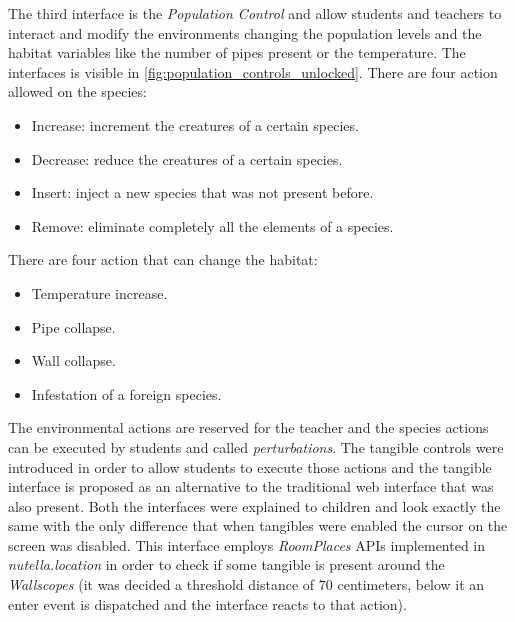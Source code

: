 The third interface is the \textit{Population Control} and allow students and teachers to interact and modify the environments changing the population levels and the habitat variables like the number of pipes present or the temperature. The interfaces is visible in \ref{fig:population_controls_unlocked}.
There are four action allowed on the species:
\begin{itemize}
    \item Increase: increment the creatures of a certain species.
    \item Decrease: reduce the creatures of a certain species.
    \item Insert: inject a new species that was not present before.
    \item Remove: eliminate completely all the elements of a species.
\end{itemize}

There are four action that can change the habitat:
\begin{itemize}
    \item Temperature increase.
    \item Pipe collapse.
    \item Wall collapse.
    \item Infestation of a foreign species.
\end{itemize}

The environmental actions are reserved for the teacher and the species actions can be executed by students and called \textit{perturbations}. The tangible controls were introduced in order to allow students to execute those actions and the tangible interface is proposed as an alternative to the traditional web interface that was also present. Both the interfaces were explained to children and look exactly the same with the only difference that when tangibles were enabled the cursor on the screen was disabled. This interface employs \textit{RoomPlaces} APIs implemented in \textit{nutella.location} in order to check if some tangible is present around the \textit{Wallscopes} (it was decided a threshold distance of 70 centimeters, below it an enter event is dispatched and the interface reacts to that action).

